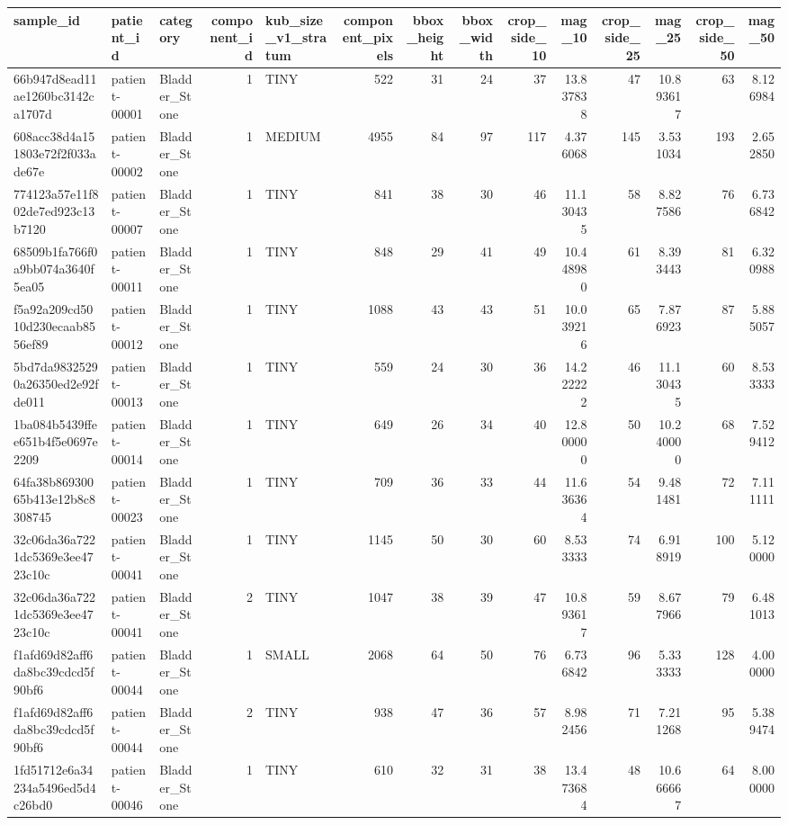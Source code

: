 \begin{tabular}{lllrlrrrrrrrrr}
\toprule
sample_id & patient_id & category & component_id & kub_size_v1_stratum & component_pixels & bbox_height & bbox_width & crop_side_10 & mag_10 & crop_side_25 & mag_25 & crop_side_50 & mag_50 \\
\midrule
66b947d8ead11ae1260bc3142ca1707d & patient-00001 & Bladder_Stone & 1 & TINY & 522 & 31 & 24 & 37 & 13.837838 & 47 & 10.893617 & 63 & 8.126984 \\
608acc38d4a151803e72f2f033ade67e & patient-00002 & Bladder_Stone & 1 & MEDIUM & 4955 & 84 & 97 & 117 & 4.376068 & 145 & 3.531034 & 193 & 2.652850 \\
774123a57e11f802de7ed923c13b7120 & patient-00007 & Bladder_Stone & 1 & TINY & 841 & 38 & 30 & 46 & 11.130435 & 58 & 8.827586 & 76 & 6.736842 \\
68509b1fa766f0a9bb074a3640f5ea05 & patient-00011 & Bladder_Stone & 1 & TINY & 848 & 29 & 41 & 49 & 10.448980 & 61 & 8.393443 & 81 & 6.320988 \\
f5a92a209cd5010d230ecaab8556ef89 & patient-00012 & Bladder_Stone & 1 & TINY & 1088 & 43 & 43 & 51 & 10.039216 & 65 & 7.876923 & 87 & 5.885057 \\
5bd7da98325290a26350ed2e92fde011 & patient-00013 & Bladder_Stone & 1 & TINY & 559 & 24 & 30 & 36 & 14.222222 & 46 & 11.130435 & 60 & 8.533333 \\
1ba084b5439ffee651b4f5e0697e2209 & patient-00014 & Bladder_Stone & 1 & TINY & 649 & 26 & 34 & 40 & 12.800000 & 50 & 10.240000 & 68 & 7.529412 \\
64fa38b86930065b413e12b8c8308745 & patient-00023 & Bladder_Stone & 1 & TINY & 709 & 36 & 33 & 44 & 11.636364 & 54 & 9.481481 & 72 & 7.111111 \\
32c06da36a7221dc5369e3ee4723c10c & patient-00041 & Bladder_Stone & 1 & TINY & 1145 & 50 & 30 & 60 & 8.533333 & 74 & 6.918919 & 100 & 5.120000 \\
32c06da36a7221dc5369e3ee4723c10c & patient-00041 & Bladder_Stone & 2 & TINY & 1047 & 38 & 39 & 47 & 10.893617 & 59 & 8.677966 & 79 & 6.481013 \\
f1afd69d82aff6da8bc39cdcd5f90bf6 & patient-00044 & Bladder_Stone & 1 & SMALL & 2068 & 64 & 50 & 76 & 6.736842 & 96 & 5.333333 & 128 & 4.000000 \\
f1afd69d82aff6da8bc39cdcd5f90bf6 & patient-00044 & Bladder_Stone & 2 & TINY & 938 & 47 & 36 & 57 & 8.982456 & 71 & 7.211268 & 95 & 5.389474 \\
1fd51712e6a34234a5496ed5d4c26bd0 & patient-00046 & Bladder_Stone & 1 & TINY & 610 & 32 & 31 & 38 & 13.473684 & 48 & 10.666667 & 64 & 8.000000 \\

\end{tabular}
